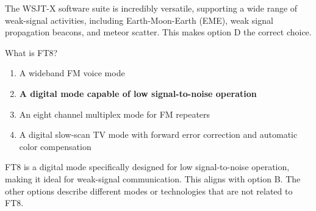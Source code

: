 The WSJT-X software suite is incredibly versatile, supporting a wide range of weak-signal activities, including Earth-Moon-Earth (EME), weak signal propagation beacons, and meteor scatter. This makes option D the correct choice.

\begin{tcolorbox}[colback=gray!10!white,colframe=black!75!black,title={T8D13}]
    What is FT8?
    \begin{enumerate}[label=\Alph*),noitemsep]
        \item A wideband FM voice mode
        \item \textbf{A digital mode capable of low signal-to-noise operation}
        \item An eight channel multiplex mode for FM repeaters
        \item A digital slow-scan TV mode with forward error correction and automatic color compensation
    \end{enumerate}
\end{tcolorbox}

FT8 is a digital mode specifically designed for low signal-to-noise operation, making it ideal for weak-signal communication. This aligns with option B. The other options describe different modes or technologies that are not related to FT8.
